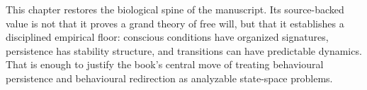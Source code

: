 \begin{summarybox}
This chapter restores the biological spine of the manuscript. Its source-backed
value is not that it proves a grand theory of free will, but that it
establishes a disciplined empirical floor: conscious conditions have organized
signatures, persistence has stability structure, and transitions can have
predictable dynamics. That is enough to justify the book's central move of
treating behavioural persistence and behavioural redirection as analyzable
state-space problems.
\end{summarybox}
